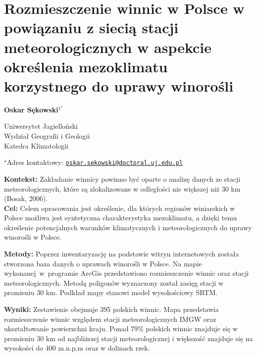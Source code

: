 \documentclass[\main/boa.tex]{subfiles}
\begin{document}
\section{Rozmieszczenie winnic w Polsce w powiązaniu z siecią stacji meteorologicznych w aspekcie określenia mezoklimatu korzystnego do uprawy winorośli}

\begin{center}
  {\bf {} Oskar Sękowski$^{1^\star}$}
\end{center}

\vskip 0.3cm

\begin{affiliations}
\begin{enumerate}
\begin{minipage}{0.915\textwidth}
\centering
\item Uniwersytet Jagielloński \\ Wydział Geografii i Geologii \\ Katedra Klimatologii\\[-2pt]
\end{minipage}
\end{enumerate}
$^\star$Adres kontaktowy: \href{mailto:oskar.sekowski@doctoral.uj.edu.pl}{\nolinkurl{oskar.sekowski@doctoral.uj.edu.pl}}\\
\end{affiliations}

\vskip 0.5cm


\vskip 0.5cm

\textbf{Kontekst:} Zakładanie winnicy powinno być oparte o analizę danych ze stacji meteorologicznych, które są zlokalizowane w odległości nie większej niż 30 km (Bosak, 2006).\\
\textbf{Cel:} Celem opracowania jest określenie, dla których regionów winiarskich w Polsce możliwa jest syntetyczna charakterystyka mezoklimatu, a dzięki temu określenie potencjalnych warunków klimatycznych i meteorologicznych do uprawy winorośli w Polsce.

\textbf{Metody:} Poprzez inwentaryzację na podstawie witryn internetowych została stworzona baza danych o uprawach winorośli w Polsce. Na mapie wykonanej~w~programie ArcGis przedstawiono rozmieszczenie winnic oraz stacji meteorologicznych. Metodą poligonów wyznaczony został zasięg stacji w promieniu 30 km. Podkład mapy stanowi model wysokościowy SRTM.

\textbf{Wyniki:} Zestawienie obejmuje 395 polskich winnic. Mapa przedstawia rozmieszczenie winnic względem stacji meteorologicznych IMGW oraz ukształtowanie powierzchni kraju. Ponad 79\% polskich winnic znajduje się w promieniu 30 km od najbliższej stacji meteorologicznej i większość znajduje się na wysokości do 400 m.n.p.m oraz w dolinach rzek. 
\end{document}
